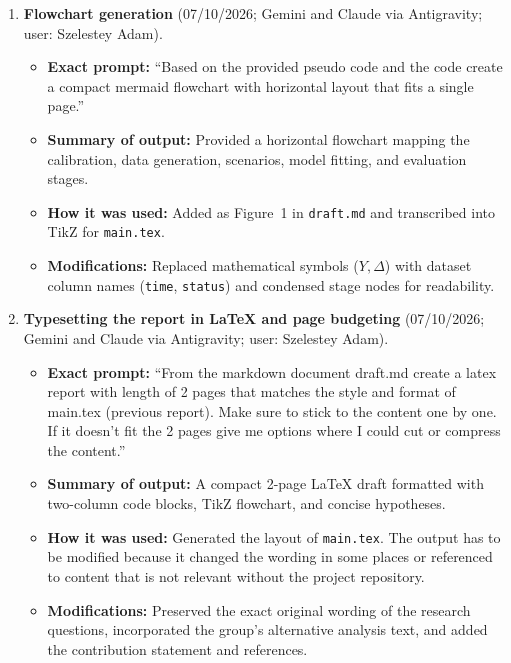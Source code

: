 \documentclass[10pt,a4paper]{article}
\begin{document}
\begin{enumerate}[leftmargin=1.4em,itemsep=3pt]
\item \textbf{Flowchart generation} (07/10/2026; Gemini and Claude via Antigravity; user: Szelestey Adam).
\begin{itemize}[leftmargin=1.2em,itemsep=1pt]
\item \textbf{Exact prompt:} ``Based on the provided pseudo code and the code create a compact mermaid flowchart with horizontal layout that fits a single page.''
\item \textbf{Summary of output:} Provided a horizontal flowchart mapping the calibration, data generation, scenarios, model fitting, and evaluation stages.
\item \textbf{How it was used:} Added as Figure~1 in \texttt{draft.md} and transcribed into TikZ for \texttt{main.tex}.
\item \textbf{Modifications:} Replaced mathematical symbols ($Y,\Delta$) with dataset column names (\texttt{time}, \texttt{status}) and condensed stage nodes for readability.
\end{itemize}

\item \textbf{Typesetting the report in LaTeX and page budgeting} (07/10/2026; Gemini and Claude via Antigravity; user: Szelestey Adam).
\begin{itemize}[leftmargin=1.2em,itemsep=1pt]
\item \textbf{Exact prompt:} ``From the markdown document draft.md create a latex report with length of 2 pages that matches the style and format of main.tex (previous report). Make sure to stick to the content one by one. If it doesn't fit the 2 pages give me options where I could cut or compress the content.''
\item \textbf{Summary of output:} A compact 2-page LaTeX draft formatted with two-column code blocks, TikZ flowchart, and concise hypotheses.
\item \textbf{How it was used:} Generated the layout of \texttt{main.tex}. The output has to be modified because it changed the wording in some places or referenced to content that is not relevant without the project repository.
\item \textbf{Modifications:} Preserved the exact original wording of the research questions, incorporated the group's alternative analysis text, and added the contribution statement and references.
\end{itemize}
\end{enumerate}
\end{document}
